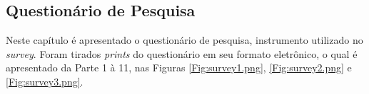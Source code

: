 \begin{apendicesenv}


\chapter{Questionário de Pesquisa}
\label{ap:questionario}

Neste capítulo é apresentado o questionário de pesquisa, instrumento utilizado no \textit{survey}. Foram tirados \textit{prints} do questionário em seu formato eletrônico, o qual é apresentado da Parte 1 à 11, nas Figuras \ref{Fig:survey1.png}, \ref{Fig:survey2.png} e \ref{Fig:survey3.png}.

\begin{figure}[htbp]
	\centering
    \quad
\end{figure}
\end{apendicesenv}
